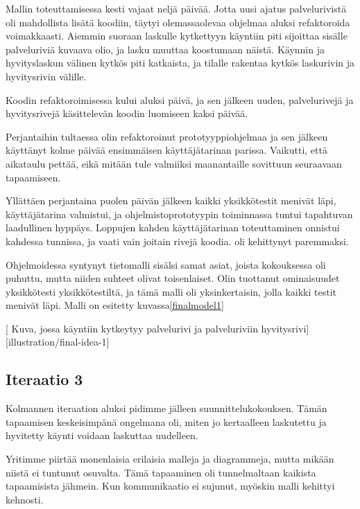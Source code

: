 Mallin toteuttamisessa kesti vajaat neljä päivää. Jotta uusi ajatus
palvelurivistä oli mahdollista lisätä koodiin, täytyi olemassaolevaa
ohjelmaa aluksi refaktoroida voimakkaasti. Aiemmin suoraan laskulle
kytkettyyn käyntiin piti sijoittaa sisälle palveluriviä kuvaava olio, ja
lasku muuttaa koostumaan näistä. Käynnin ja hyvityslaskun välinen kytkös
piti katkaista, ja tilalle rakentaa kytkös laskurivin ja hyvitysrivin
välille.

Koodin refaktoroimisessa kului aluksi päivä, ja sen jälkeen uuden,
palvelurivejä ja hyvitysrivejä käsittelevän koodin luomiseen kaksi
päivää.

Perjantaihin tultaessa olin refaktoroinut prototyyppiohjelmaa ja sen
jälkeen käyttänyt kolme päivää ensimmäisen käyttäjätarinan parissa.
Vaikutti, että aikataulu pettää, eikä mitään tule valmiiksi maanantaille
sovittuun seuraavaan tapaamiseen.

Yllättäen perjantaina puolen päivän jälkeen kaikki yksikkötestit menivät
läpi, käyttäjätarina valmistui, ja ohjelmistoprototyypin toiminnassa
tuntui tapahtuvan laadullinen hyppäys. Loppujen kahden käyttäjätarinan
toteuttaminen onnistui kahdessa tunnissa, ja vaati vain joitain rivejä
koodia.  oli kehittynyt paremmaksi.

Ohjelmoidessa syntynyt tietomalli sisälsi samat asiat, joista
kokouksessa oli puhuttu, mutta niiden suhteet olivat toisenlaiset. Olin
tuottanut ominaisuudet yksikkötesti yksikkötestiltä, ja tämä malli oli
yksinkertaisin, jolla kaikki testit menivät läpi. Malli on esitetty
kuvassa\ref{finalmodel1}

{[}\label{finalmodel1} Kuva, jossa käyntiin kytkeytyy palvelurivi ja
palveluriviin hyvitysrivi{]}{[}illustration/final-idea-1{]}

\hypertarget{iteraatio-3}{%
\subsection{Iteraatio 3}\label{iteraatio-3}}

Kolmannen iteraation aluksi pidimme jälleen suunnittelukokouksen. Tämän
tapaamisen keskeisimpänä ongelmana oli, miten jo kertaalleen laskutettu
ja hyvitetty käynti voidaan laskuttaa uudelleen.

Yritimme piirtää monenlaisia erilaisia malleja ja diagrammeja, mutta
mikään niistä ei tuntunut osuvalta. Tämä tapaaminen oli tunnelmaltaan
kaikista tapaamisista jähmein. Kun kommunikaatio ei sujunut, myöskin
malli kehittyi kehnosti.

